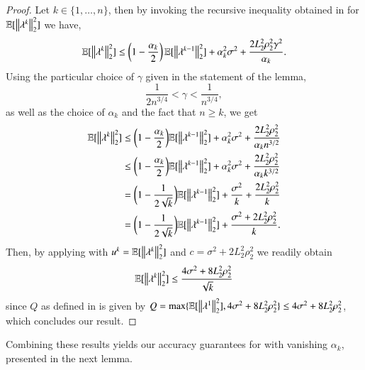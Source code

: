 \begin{toappendix}
\begin{proof}
    Let $k\in\{1,\ldots,n\}$, then by invoking the recursive inequality obtained in  for $\mathbb{E}[\left\Vert{\lambda^k}\right\Vert_2^2]$ we have,
    \begin{equation}
        \mathbb{E}[\left\Vert{\lambda^k}\right\Vert^{2}_{2}]\leq \left(1-\frac{\alpha_{k}}{2}\right)\mathbb{E}[\left\Vert{\lambda^{k-1}}\right\Vert^{2}_{2}]+\alpha_{k}^{2}\sigma^{2}+\frac{2L_2^2\rho_2^2\gamma^2}{\alpha_{k}}.
        \end{equation}
        Using the particular choice of $\gamma$ given in the statement of the lemma,
        \begin{equation}
            \frac{1}{2 n^{3/4}}<\gamma <\frac{1}{n^{3/4}},
        \end{equation}
        as well as the choice of $\alpha_k$ and the fact that $n\geq k$, we get
    \begin{align*}
        \mathbb{E}[\left\Vert{\lambda^k}\right\Vert_2^{2}]
            &\leq \bigg(1-\frac{\alpha_{k}}{2} \bigg)\mathbb{E}[\left\Vert{\lambda^{k-1}}\right\Vert_2^{2}]+\alpha_{k}^{2}\sigma^{2}+\frac{2L_2^2\rho_2^2}{\alpha_{k}n^{3/2}}\\
            &\leq \bigg(1-\frac{\alpha_{k}}{2} \bigg)\mathbb{E}[\left\Vert{\lambda^{k-1}}\right\Vert_2^{2}]+\alpha_{k}^{2}\sigma^{2}+\frac{2L_2^2\rho_2^2}{\alpha_{k}k^{3/2}}\\
            &=\bigg(1-\frac{1}{2\sqrt{k}}\bigg)\mathbb{E}[\left\Vert{\lambda^{k-1}}\right\Vert_2^{2}]+\frac{\sigma^{2}}{k}+\frac{2L_2^2\rho_2^2}{k}\\
            &= \bigg(1-\frac{1}{2\sqrt{k}}\bigg)\mathbb{E}[\left\Vert{\lambda^{k-1}}\right\Vert_2^{2}]+\frac{\sigma^{2}+2L_2^2\rho_2^2}{k}.
        \end{align*}
    Then, by applying  with $u^k = \mathbb{E}[\left\Vert{\lambda^k}\right\Vert_2^2]$ and $c=\sigma^2+2L_2^2\rho_2^2$ we readily obtain
    \begin{equation}
        \mathbb{E}[\left\Vert{\lambda^{k}}\right\Vert_{2}^{2}]\leq \frac{4\sigma^2+8L_2^2\rho_2^2}{\sqrt{k}}
    \end{equation}
    since $Q$ as defined in  is given by $Q = \max\{\mathbb{E}[\left\Vert{\lambda^1}\right\Vert_2^2], 4\sigma^2+8L_2^2\rho_2^2\} \leq 4\sigma^2+8L_2^2\rho_2^2$, which concludes our result.
\end{proof}

Combining these results yields our accuracy guarantees for  with vanishing $\alpha_k$, presented in the next lemma.
\end{toappendix}

